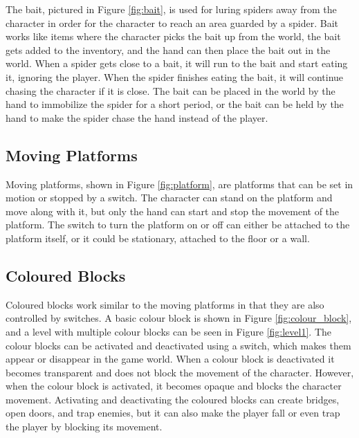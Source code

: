 
The bait, pictured in Figure \ref{fig:bait}, is used for luring spiders away from the character in order for the character to reach an area guarded by a spider. Bait works like items where the character picks the bait up from the world, the bait gets added to the inventory, and the hand can then place the bait out in the world. When a spider gets close to a bait, it will run to the bait and start eating it, ignoring the player. When the spider finishes eating the bait, it will continue chasing the character if it is close. The bait can be placed in the world by the hand to immobilize the spider for a short period, or the bait can be held by the hand to make the spider chase the hand instead of the player.

\subsection{Moving Platforms}


Moving platforms, shown in Figure \ref{fig:platform}, are platforms that can be set in motion or stopped by a switch. The character can stand on the platform and move along with it, but only the hand can start and stop the movement of the platform. The switch to turn the platform on or off can either be attached to the platform itself, or it could be stationary, attached to the floor or a wall.

\subsection{Coloured Blocks}


 Coloured blocks work similar to the moving platforms in that they are also controlled by switches. A basic colour block is shown in Figure \ref{fig:colour_block}, and a level with multiple colour blocks can be seen in Figure \ref{fig:level1}. The colour blocks can be activated and deactivated using a switch, which makes them appear or disappear in the game world. When a colour block is deactivated it becomes transparent and does not block the movement of the character. However, when the colour block is activated, it becomes opaque and blocks the character movement. Activating and deactivating the coloured blocks can create bridges, open doors, and trap enemies, but it can also make the player fall or even trap the player by blocking its movement.

